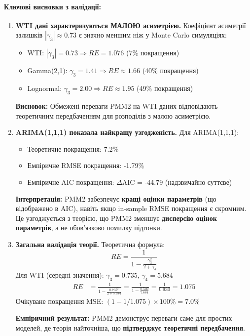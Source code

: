\documentclass[12pt,a4paper]{article}
\begin{document}
\paragraph{Ключові висновки з валідації:}

\begin{enumerate}
    \item \textbf{WTI дані характеризуються МАЛОЮ асиметрією.} Коефіцієнт асиметрії залишків $|\gamma_3| \approx 0.73$ є значно меншим ніж у Monte Carlo симуляціях:
    \begin{itemize}
        \item WTI: $|\gamma_3| = 0.73 \Rightarrow RE = 1.076$ (7\% покращення)
        \item Gamma(2,1): $\gamma_3 = 1.41 \Rightarrow RE \approx 1.66$ (40\% покращення)
        \item Lognormal: $\gamma_3 = 2.00 \Rightarrow RE \approx 1.95$ (49\% покращення)
    \end{itemize}
    \textbf{Висновок:} Обмежені переваги PMM2 на WTI даних відповідають теоретичним передбаченням для розподілів з малою асиметрією.

    \item \textbf{ARIMA(1,1,1) показала найкращу узгодженість.} Для ARIMA(1,1,1):
    \begin{itemize}
        \item Теоретичне покращення: 7.2\%
        \item Емпіричне RMSE покращення: -1.79\%
        \item Емпіричне AIC покращення: $\Delta$AIC = -44.79 (надзвичайно суттєве)
    \end{itemize}
    \textbf{Інтерпретація:} PMM2 забезпечує \textbf{кращі оцінки параметрів} (що відображено в AIC), навіть якщо in-sample RMSE покращення є скромним. Це узгоджується з теорією, що PMM2 зменшує \textbf{дисперсію оцінок параметрів}, а не обов'язково помилку підгонки.

    \item \textbf{Загальна валідація теорії.} Теоретична формула:
    \begin{equation*}
    RE = \frac{1}{1 - \frac{\gamma_3^2}{2+\gamma_4}}
    \end{equation*}
    Для WTI (середні значення): $\gamma_3 = 0.735$, $\gamma_4 = 5.684$
    \begin{align*}
    RE &= \frac{1}{1 - \frac{0.735^2}{2+5.684}} = \frac{1}{1 - \frac{0.540}{7.684}} = \frac{1}{0.930} = 1.075
    \end{align*}
    Очікуване покращення MSE: $(1 - 1/1.075) \times 100\% = 7.0\%$

    \textbf{Емпіричний результат:} PMM2 демонструє переваги саме для простих моделей, де теорія найточніша, що \textbf{підтверджує теоретичні передбачення}.
\end{enumerate}
\end{document}
